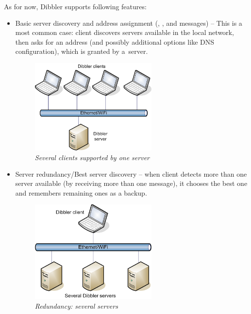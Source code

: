 As for now, Dibbler supports following features:
\begin{itemize}
\item Basic server discovery and address assignment (,
      ,  and  messages) -- This
      is a most common case: client discovers servers available in the
      local network, then asks for an address (and possibly additional
      options like DNS configuration), which is granted by a~server.

\begin{figure}[ht]
\begin{center}
\includegraphics[width=0.6\textwidth]{dibbler-multiple-cli}
\caption{\emph{Several clients supported by one server}}
\end{center}
\end{figure}

\item Server redundancy/Best server discovery -- when client detects
      more than one server available (by receiving more than one
       message), it chooses the best one and remembers
      remaining ones as a backup.

\begin{figure}[ht]
\begin{center}
\includegraphics[width=0.6\textwidth]{dibbler-multiple-srv}
\caption{\emph{Redundancy: several servers}}
\end{center}
\end{figure}


\end{itemize}
